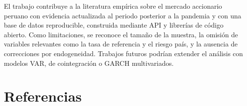 \documentclass[12pt, a4paper]{article}
\begin{document}
El trabajo contribuye a la literatura empírica sobre el mercado accionario peruano con evidencia actualizada al periodo posterior a la pandemia y con una base de datos reproducible, construida mediante API y librerías de código abierto. Como limitaciones, se reconoce el tamaño de la muestra, la omisión de variables relevantes como la tasa de referencia y el riesgo país, y la ausencia de correcciones por endogeneidad. Trabajos futuros podrían extender el análisis con modelos VAR, de cointegración o GARCH multivariados.

\newpage
\section*{Referencias}
\end{document}
